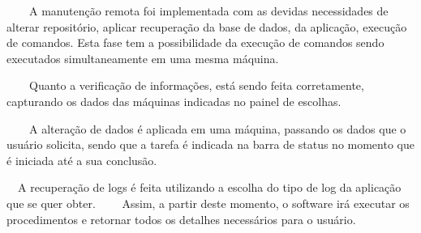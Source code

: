         \bigskip

{\color{black}
    \ \ \ \ A manuten\c{c}\~ao remota foi implementada com as devidas necessidades de alterar reposit\'orio, aplicar
        recupera\c{c}\~ao da base de dados, da aplica\c{c}\~ao, execu\c{c}\~ao de comandos. Esta fase tem a possibilidade da
        execu\c{c}\~ao de comandos sendo executados simultaneamente em uma mesma m\'aquina.}


        \bigskip

{\color{black}
    \ \ \ \ Quanto a verifica\c{c}\~ao de informa\c{c}\~oes, est\'a sendo feita corretamente, capturando os dados das
        m\'aquinas indicadas no painel de escolhas. }


        \bigskip

{\color{black}
    \ \ \ \ A altera\c{c}\~ao de dados \'e aplicada em uma m\'aquina, passando os dados que o usu\'ario solicita, sendo que
        a tarefa \'e indicada na barra de status no momento que \'e iniciada at\'e a sua conclus\~ao.}


        \bigskip

{\color{black}
    \ \ A recupera\c{c}\~ao de logs \'e feita utilizando a escolha do tipo de log da aplica\c{c}\~ao que se quer obter.
        \ \ \ \ Assim, a partir deste momento, o software ir\'a executar os procedimentos e retornar todos os detalhes
        necess\'arios para o usu\'ario.}


